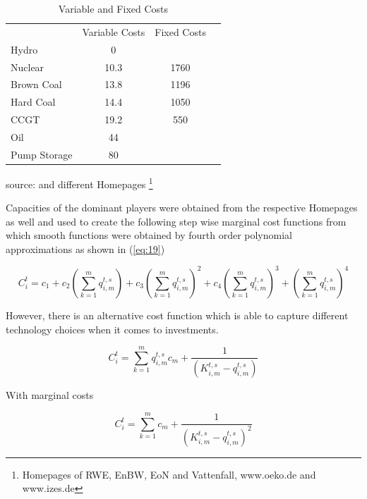 \begin{table}
\begin{tabular}{llll}
 & Variable Costs & Fixed Costs &  \\ 
Hydro & \multicolumn{1}{c}{0} & \multicolumn{1}{c}{} &  \\ 
Nuclear & \multicolumn{1}{c}{10.3} & \multicolumn{1}{c}{1760} &  \\ 
Brown Coal & \multicolumn{1}{c}{13.8} & \multicolumn{1}{c}{1196} &  \\ 
Hard Coal & \multicolumn{1}{c}{14.4} & \multicolumn{1}{c}{1050} &  \\ 
CCGT & \multicolumn{1}{c}{19.2} & \multicolumn{1}{c}{550} &  \\ 
Oil & \multicolumn{1}{c}{44} & \multicolumn{1}{c}{} &  \\ 
Pump Storage & \multicolumn{1}{c}{80} &  &  \\ 
\end{tabular}\label{tab:costs}
\caption{Variable and Fixed Costs}
\begin{center}
source: \cite{Leprich2004} and different Homepages  \footnote{Homepages of RWE, EnBW, EoN and Vattenfall, www.oeko.de and www.izes.de}
\end{center}
\end{table}

Capacities of the dominant players were obtained from the respective Homepages as well and used to create the following step wise marginal cost functions from which smooth functions were obtained by fourth order polynomial approximations as shown in (\ref{eq:19})

\begin{equation}
  \label{eq:19}
  C^t_{i} = c_1 + c_2 (\sum_{k=1}^m q^{t,s}_{i,m}) + c_3(\sum_{k=1}^m q^{t,s}_{i,m})^2 + c_4(\sum_{k=1}^m q^{t,s}_{i,m})^3 + (\sum_{k=1}^m q^{t,s}_{i,m})^4
 \end{equation}

However, there is an alternative cost function which is able to capture different technology choices when it comes to investments.

\begin{equation}
  \label{eq:20}
		C^{t}_{i} = \sum_{k=1}^{m} q^{t,s}_{i,m} c_m + \frac{1}{(K^{t,s}_{i,m}-q^{t,s}_{i,m})}
 \end{equation}

With marginal costs

\begin{equation}
  \label{eq:20}
		C^{t}_{i} = \sum_{k=1}^{m} c_m + \frac{1}{(K^{t,s}_{i,m}-q^{t,s}_{i,m})^2}
 \end{equation}





